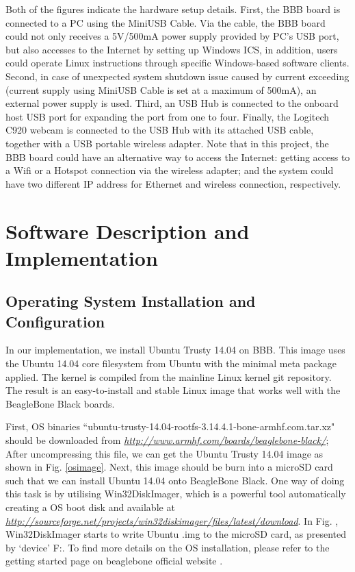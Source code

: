 \documentclass[12pt,journal,draftclsnofoot,onecolumn]{IEEEtran}
\begin{document}
Both of the figures indicate the hardware setup details. First, the BBB board is connected to a PC using the MiniUSB Cable. Via the cable, the BBB board could not only receives a 5V/500mA power supply provided by PC's USB port, but also accesses to the Internet by setting up Windows ICS, in addition, users could operate Linux instructions through specific Windows-based software clients. Second, in case of unexpected system shutdown issue caused by current exceeding (current supply using MiniUSB Cable is set at a maximum of 500mA), an external power supply is used. Third, an USB Hub is connected to the onboard host USB port for expanding the port from one to four. Finally, the Logitech C920 webcam is connected to the USB Hub with its attached USB cable, together with a USB portable wireless adapter. Note that in this project, the BBB board could have an alternative way to access the Internet: getting access to a Wifi or a Hotspot connection via the wireless adapter; and the system could have two different IP address for Ethernet and wireless connection, respectively.


\section{Software Description and Implementation}\label{SfDes}
	
	\subsection{Operating System Installation and Configuration}\label{Sys}
	In our implementation, we install Ubuntu Trusty 14.04 on BBB. This image uses the Ubuntu 14.04 core filesystem from Ubuntu with the minimal meta package applied. The kernel is compiled from the mainline Linux kernel git repository. The result is an easy-to-install and stable Linux image that works well with the BeagleBone Black boards.

First, OS binaries ``ubuntu-trusty-14.04-rootfs-3.14.4.1-bone-armhf.com.tar.xz" should be downloaded from \textcolor{blue}{\textit{\url{http://www.armhf.com/boards/beaglebone-black/}}}; After uncompressing this file, we can get the Ubuntu Trusty 14.04 image as shown in Fig. \ref{osimage}. Next, this image should be burn into a microSD card such that we can install Ubuntu 14.04 onto BeagleBone Black. One way of doing this task is by utilising Win32DiskImager, which is a powerful tool automatically creating a OS boot disk and available at \textcolor{blue}{\textit{\url{http://sourceforge.net/projects/win32diskimager/files/latest/download}}}. In Fig. , Win32DiskImager starts to write Ubuntu .img to the microSD card, as presented by `device' F:. To find more details on the OS installation, please refer to the getting started page on beaglebone official website \cite{startBB}. 
\end{document}
